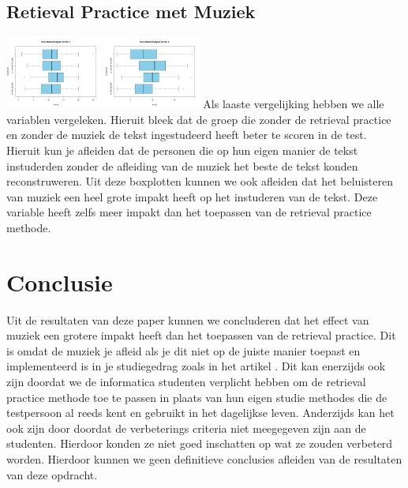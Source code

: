 \documentclass{hogent-article}
\begin{document}
	\subsection{Retieval Practice met Muziek}
	\includegraphics[width=120px]{Rplot_RetrievalPracticeMuziek_Score1}	
	\includegraphics[width=120px]{Rplot_RetrievalPracticeMuziek_Score2}
	Als laaste vergelijking hebben we alle variablen vergeleken. Hieruit bleek dat de groep die zonder de retrieval practice en zonder de muziek de tekst ingestudeerd heeft beter te scoren in de test. Hieruit kun je afleiden dat de personen die op hun eigen manier de tekst instuderden zonder de afleiding van de muziek het beste de tekst konden reconstruweren.
	Uit deze boxplotten kunnen we ook afleiden dat het beluisteren van muziek een heel grote impakt heeft op het instuderen van de tekst. Deze variable heeft zelfs meer impakt dan het toepassen van de retrieval practice methode.  
	
	\section{Conclusie}
	Uit de resultaten van deze paper kunnen we concluderen dat het effect van muziek een grotere impakt heeft dan het toepassen van de retrieval practice. Dit is omdat de muziek je afleid als je dit niet op de juiste manier toepast en implementeerd is in je studiegedrag zoals in het artikel \autocite{ChanEtAl1998}. Dit kan enerzijds ook zijn doordat we de informatica studenten verplicht hebben om de retrieval practice methode toe te passen in plaats van hun eigen studie methodes die de testpersoon al reeds kent en gebruikt in het dagelijkse leven. Anderzijds kan het ook zijn door doordat de verbeterings criteria niet meegegeven zijn aan de studenten. Hierdoor konden ze niet goed inschatten op wat ze zouden verbeterd worden. Hierdoor kunnen we geen definitieve conclusies afleiden van de resultaten van deze opdracht.
	
	
	\printbibliography[heading=bibintoc]
	
\end{document}
